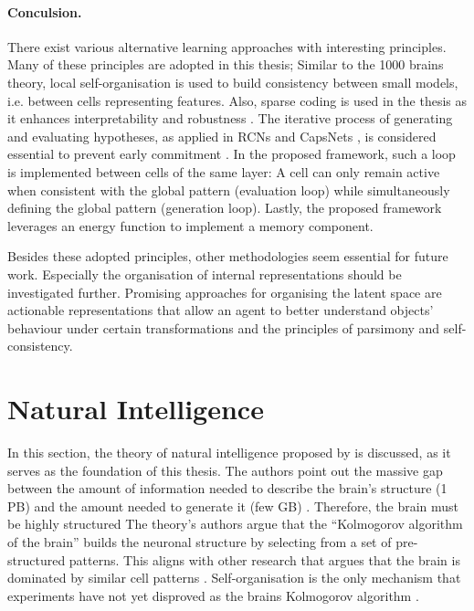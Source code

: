 \paragraph{Conculsion.} There exist various alternative learning approaches with interesting principles. Many of these principles are adopted in this thesis; Similar to the 1000 brains theory, local self-organisation is used to build consistency between small models, i.e. between cells representing features.
Also, sparse coding is used in the thesis as it enhances interpretability and robustness . The iterative process of generating and evaluating hypotheses, as applied in RCNs  and CapsNets \cite{sabour_dynamic_2017}, is considered essential to prevent early commitment \cite{marr_vision_2010}. In the proposed framework, such a loop is implemented between cells of the same layer: A cell can only remain active when consistent with the global pattern (evaluation loop) while simultaneously defining the global pattern (generation loop). Lastly, the proposed framework leverages an energy function to implement a memory component. 

Besides these adopted principles, other methodologies seem essential for future work. Especially the organisation of internal representations should be investigated further. Promising approaches for organising the latent space are actionable representations that allow an agent to better understand objects' behaviour under certain transformations and the principles of parsimony and self-consistency.

\section{Natural Intelligence}
In this section, the theory of natural intelligence proposed by  is discussed, as it serves as the foundation of this thesis.
The authors point out the massive gap between the amount of information needed to describe the brain's structure (1 PB) and the amount needed to generate it (few GB) . Therefore, the brain must be highly structured 
The theory's authors argue that the ``Kolmogorov algorithm  of the brain'' builds the neuronal structure by selecting from a set of pre-structured patterns. This aligns with other research that argues that the brain is dominated by similar cell patterns .
Self-organisation is the only mechanism that experiments have not yet disproved as the brains Kolmogorov algorithm \cite{willshaw_how_1976, willshaw_marker_1979, singer_brain_1986, kelso_selforganizing_1995, kelso_dynamic_1999}.

